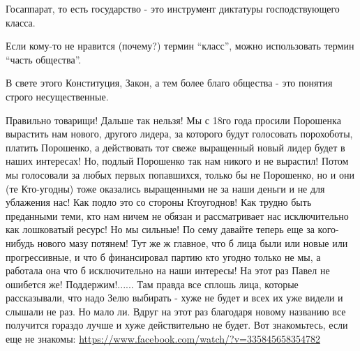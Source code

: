 \begin{itemize}
Госаппарат, то есть государство - это инструмент диктатуры господствующего
класса.

Если кому-то не нравится (почему?) термин \enquote{класс}, можно использовать
термин \enquote{часть общества}.

В свете этого Конституция, Закон, а тем более благо общества - это понятия
строго несущественные.


Правильно товарищи! Дальше так нельзя! Мы с 18го года просили Порошенка
вырастить нам нового, другого лидера, за которого будут голосовать порохоботы,
платить Порошенко, а действовать тот свеже выращенный новый лидер будет в наших
интересах! Но, подлый Порошенко так нам никого и не вырастил! Потом мы
голосовали за любых первых попавшихся, только бы не Порошенко, но и они (те
Кто-угодны) тоже оказались выращенными не за наши деньги и не для ублажения
нас! Как подло это со стороны Ктоугоднов! Как трудно быть преданными теми, кто
нам ничем не обязан и рассматривает нас исключительно как лошковатый ресурс! Но
мы сильные! По сему давайте теперь еще за кого-нибудь нового мазу потянем! Тут
же ж главное, что б лица были или новые или прогрессивные, и что б финансировал
партию кто угодно только не мы, а работала она что б исключительно на наши
интересы! На этот раз Павел не ошибется же! Поддержим!...... Там правда все
сплошь лица, которые рассказывали, что надо Зелю выбирать - хуже не будет и
всех их уже видели и слышали не раз. Но мало ли. Вдруг на этот раз благодаря
новому названию все получится гораздо лучше и хуже действительно не будет. Вот
знакомьтесь, если еще не знакомы:
\url{https://www.facebook.com/watch/?v=335845658354782}


\end{itemize} %
